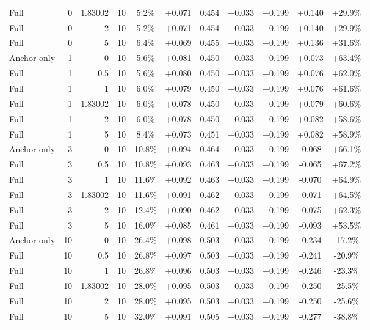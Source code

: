 \begin{table}[htbp]
\begin{tabular}{lrrrccccccc}
Full & 0 & 1.83002 & 10 & 5.2\% & +0.071 & 0.454 & +0.033 & +0.199 & +0.140 & +29.9\% \\
Full & 0 & 2 & 10 & 5.2\% & +0.071 & 0.454 & +0.033 & +0.199 & +0.140 & +29.9\% \\
Full & 0 & 5 & 10 & 6.4\% & +0.069 & 0.455 & +0.033 & +0.199 & +0.136 & +31.6\% \\
Anchor only & 1 & 0 & 10 & 5.6\% & +0.081 & 0.450 & +0.033 & +0.199 & +0.073 & +63.4\% \\
Full & 1 & 0.5 & 10 & 5.6\% & +0.080 & 0.450 & +0.033 & +0.199 & +0.076 & +62.0\% \\
Full & 1 & 1 & 10 & 6.0\% & +0.079 & 0.450 & +0.033 & +0.199 & +0.076 & +61.6\% \\
Full & 1 & 1.83002 & 10 & 6.0\% & +0.078 & 0.450 & +0.033 & +0.199 & +0.079 & +60.6\% \\
Full & 1 & 2 & 10 & 6.0\% & +0.078 & 0.450 & +0.033 & +0.199 & +0.082 & +58.6\% \\
Full & 1 & 5 & 10 & 8.4\% & +0.073 & 0.451 & +0.033 & +0.199 & +0.082 & +58.9\% \\
Anchor only & 3 & 0 & 10 & 10.8\% & +0.094 & 0.464 & +0.033 & +0.199 & -0.068 & +66.1\% \\
Full & 3 & 0.5 & 10 & 10.8\% & +0.093 & 0.463 & +0.033 & +0.199 & -0.065 & +67.2\% \\
Full & 3 & 1 & 10 & 11.6\% & +0.092 & 0.463 & +0.033 & +0.199 & -0.070 & +64.9\% \\
Full & 3 & 1.83002 & 10 & 11.6\% & +0.091 & 0.462 & +0.033 & +0.199 & -0.071 & +64.5\% \\
Full & 3 & 2 & 10 & 12.4\% & +0.090 & 0.462 & +0.033 & +0.199 & -0.075 & +62.3\% \\
Full & 3 & 5 & 10 & 16.0\% & +0.085 & 0.461 & +0.033 & +0.199 & -0.093 & +53.5\% \\
Anchor only & 10 & 0 & 10 & 26.4\% & +0.098 & 0.503 & +0.033 & +0.199 & -0.234 & -17.2\% \\
Full & 10 & 0.5 & 10 & 26.8\% & +0.097 & 0.503 & +0.033 & +0.199 & -0.241 & -20.9\% \\
Full & 10 & 1 & 10 & 26.8\% & +0.096 & 0.503 & +0.033 & +0.199 & -0.246 & -23.3\% \\
Full & 10 & 1.83002 & 10 & 28.0\% & +0.095 & 0.503 & +0.033 & +0.199 & -0.250 & -25.5\% \\
Full & 10 & 2 & 10 & 28.0\% & +0.095 & 0.503 & +0.033 & +0.199 & -0.250 & -25.6\% \\
Full & 10 & 5 & 10 & 32.0\% & +0.091 & 0.505 & +0.033 & +0.199 & -0.277 & -38.8\% \\

\end{tabular}
\end{table}

